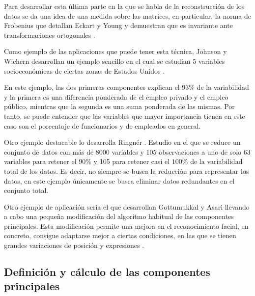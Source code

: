 \noindent Para desarrollar esta última parte en la que se habla de la reconstrucción de los datos se da una idea de una medida sobre las matrices, en particular, la norma de Frobenius que detallan Eckart y Young y demuestran que es invariante ante transformaciones ortogonales \cite{Eckart 1936}.

\noindent Como ejemplo de las aplicaciones que puede tener esta técnica, Johnson y Wichern desarrollan un ejemplo sencillo en el cual se estudian 5 variables socioeconómicas de ciertas zonas de Estados Unidos \cite{Johnson 2007}.

\noindent En este ejemplo, las dos primeras componentes explican el $93\%$ de la variabilidad y la primera es una diferencia ponderada de el empleo privado y el empleo público, mientras que la segunda es una suma ponderada de las mismas. Por tanto, se puede entender que las variables que mayor importancia tienen en este caso son el porcentaje de funcionarios y de empleados en general.

\noindent Otro ejemplo destacable lo desarrolla Ringnér \cite{Ringnér 2008}. Estudio en el que se reduce un conjunto de datos con más de 8000 variables y 105 observaciones a uno de solo 63 variables para retener el $90\%$ y 105 para retener casi el $100\%$ de la variabilidad total de los datos. Es decir, no siempre se busca la reducción para representar los datos, en este ejemplo únicamente se busca eliminar datos redundantes en el conjunto total. 

\noindent Otro ejemplo de aplicación sería el que desarrollan Gottumukkal y Asari llevando a cabo una pequeña modificación del algoritmo habitual de las componentes principales. Esta modificación permite una mejora en el reconocimiento facial, en concreto, consigue adaptarse mejor a ciertas condiciones, en las que se tienen grandes variaciones de posición y expresiones \cite {Asari 2004}.

\subsection{Definición y cálculo de las componentes principales}

